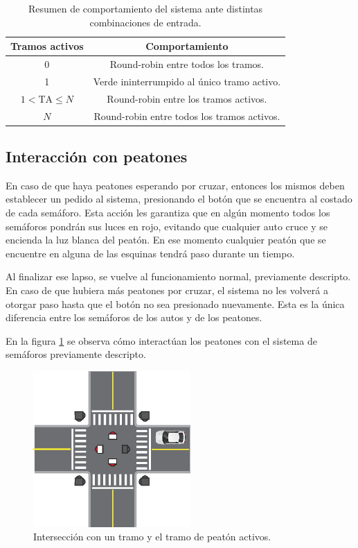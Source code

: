 		\begin{table}[htbp]
			\centering
			\caption{Resumen de comportamiento del sistema ante distintas combinaciones de entrada.}
			\vspace{0.25cm}
			\label{tab:comportamiento}
			\begin{tabular}{cc}
				\toprule
				\bf{Tramos activos} & \bf{Comportamiento} \\
				\midrule
				0 & Round-robin entre todos los tramos. \\
				1 & Verde ininterrumpido al único tramo activo. \\
				$1 < \mbox{TA} \le N$ & Round-robin entre los tramos activos. \\
				$N$ & Round-robin entre todos los tramos activos. \\
				\bottomrule
			\end{tabular}
		\end{table}



	\subsection{Interacción con peatones}

		En caso de que haya peatones esperando por cruzar, entonces los mismos deben establecer un pedido al sistema, presionando el botón que se encuentra al costado de cada semáforo.
		Esta acción les garantiza que en algún momento todos los semáforos pondrán sus luces en rojo, evitando que cualquier auto cruce y se encienda la luz blanca del peatón.
		En ese momento cualquier peatón que se encuentre en alguna de las esquinas tendrá paso durante un tiempo.

		Al finalizar ese lapso, se vuelve al funcionamiento normal, previamente descripto.
		En caso de que hubiera más peatones por cruzar, el sistema no les volverá a otorgar paso hasta que el botón no sea presionado nuevamente.
		Esta es la única diferencia entre los semáforos de los autos y de los peatones.

		En la figura \ref{fig:peaton-activo} se observa cómo interactúan los peatones con el sistema de semáforos previamente descripto.

		\begin{figure}[htbp]
			\centering
			\includegraphics[width=6cm]{imagenes/peaton-auto.eps}
			\caption{Intersección con un tramo y el tramo de peatón activos.}
			\label{fig:peaton-activo}
		\end{figure}



